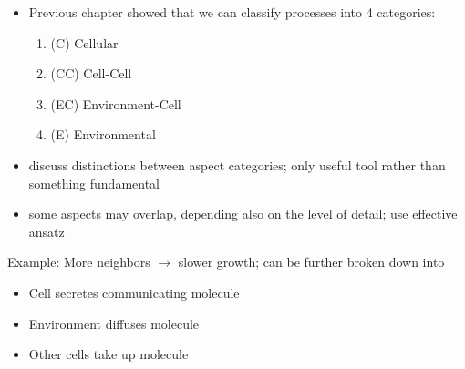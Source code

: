 %

\begin{itemize}
    \item Previous chapter showed that we can classify processes into 4 categories:
    \begin{enumerate}
        \item (C) Cellular
        \item (CC) Cell-Cell
        \item (EC) Environment-Cell
        \item (E) Environmental
    \end{enumerate}
    \item discuss distinctions between aspect categories; only useful tool rather than something
        fundamental
    \item some aspects may overlap, depending also on the level of detail; use effective ansatz
\end{itemize}

Example: More neighbors $\rightarrow$ slower growth; can be further broken down into
\begin{itemize}
    \item Cell secretes communicating molecule
    \item Environment diffuses molecule
    \item Other cells take up molecule
\end{itemize}


